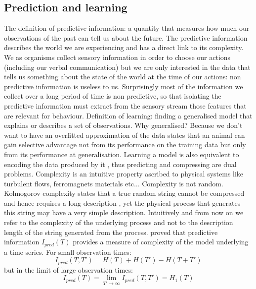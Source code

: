 \subsection{Prediction and learning}
\label{Appendix:PredictionAndLearning}
The definition of predictive information: a quantity that measures how much our
observations of the past can tell us about the future. The predictive information
 describes the world we are experiencing and has a direct link to its complexity.
We as organisms collect sensory information in order to choose our actions
(including our verbal communication) but we are only interested in the data
 that tells us something about the state of the world at the time of our actions:
 non predictive information is useless to us. Surprisingly most of the information
 we collect over a long period of time is non predictive, so that isolating the
predictive information must extract from the sensory stream those features that
 are relevant for behaviour.
Definition of learning: finding a generalised model that explains or describes
 a set of observations. Why generalised?
Because we don't want to have an overfitted approximation of the data \citep{Vapnik1998:StatisticalLearningTheory}
 states that an animal can gain selective advantage not from its performance on the
 training data but only from its performance at generalisation.
Learning a model is also equivalent to encoding the data produced by it \citep{Rissanen1989:Complexity},
thus predicting and compressing are dual problems.
Complexity is an intuitive property ascribed to physical systems like turbulent flows,
ferromagnets materials etc...
Complexity is not random. Kolmogorov complexity states that a true random string
 cannot be compressed and hence requires a long description \citep{Kolmogorov1965:InfoDefinition}, yet
 the physical process that generates this string may have a very simple description.
Intuitively and from now on we refer to the complexity of the underlying process
 and not to the description length of the string generated from the process.
\citet{Bialek2001:Complexity} proved that predictive information $I_{pred}(T)$ provides
 a measure of complexity of the model underlying a time series. For small observation times:
\begin{equation}
I_{pred}(T,T')=H(T)+H(T')-H(T+T')\label{Ipredgeneral}
\end{equation}
 but in the limit of large observation times:
\begin{equation}
I_{pred}(T)=\lim_{T'\to\infty} I_{pred}(T,T')=H_{1}(T)
\end{equation}
